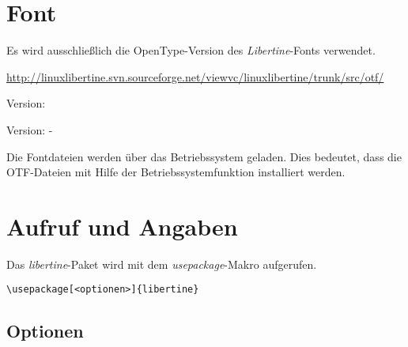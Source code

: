 \documentclass{fontdoku}
\begin{document}
\section{Font}

Es wird ausschließlich die OpenType-Version des \emph{Libertine}-Fonts verwendet.




\begin{description}
\item[Font] \url{http://linuxlibertine.svn.sourceforge.net/viewvc/linuxlibertine/trunk/src/otf/}
\item[\XeTeX] Version: \the\XeTeXversion\XeTeXrevision
\item[libertine] Version: \libertineVersionDate\space-\space\libertineVersion
\end{description}


Die Fontdateien werden über das Betriebssystem geladen. Dies bedeutet, dass die OTF-Dateien mit Hilfe der Betriebssystemfunktion installiert werden.

\section{Aufruf und Angaben}

Das \emph{libertine}-Paket wird mit dem \emph{usepackage}-Makro aufgerufen.

\begin{lstlisting}
\usepackage[<optionen>]{libertine}
\end{lstlisting}

\subsection{Optionen}
\end{document}
